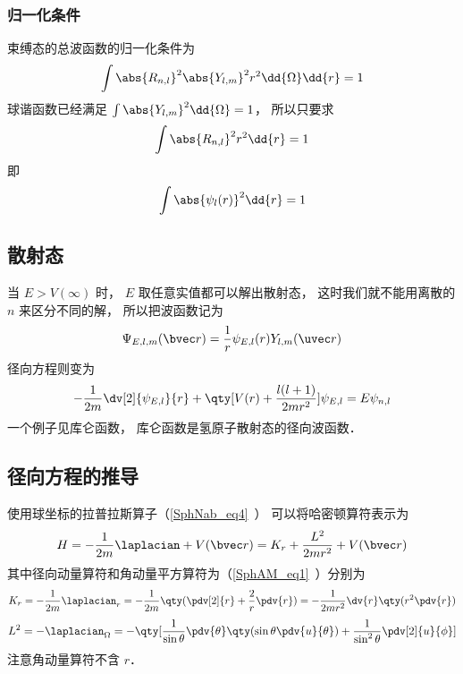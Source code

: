 \subsubsection{归一化条件}
束缚态的总波函数的归一化条件为
\begin{equation}
\int \abs{R_{n,l}}^2 \abs{Y_{l,m}}^2 r^2 \dd{\Omega}\dd{r}  = 1
\end{equation}
球谐函数已经满足 $\int \abs{Y_{l,m}}^2 \dd{\Omega} = 1$，  所以只要求
\begin{equation}
\int \abs{R_{n,l}}^2 r^2 \dd{r}  = 1
\end{equation}
即
\begin{equation}
\int \abs{\psi_l(r)}^2 \dd{r}  = 1
\end{equation}

\subsection{散射态}
当 $E > V(\infty)$ 时， $E$ 取任意实值都可以解出散射态， 这时我们就不能用离散的 $n$ 来区分不同的解， 所以把波函数记为
\begin{equation}
\Psi_{E, l,m}(\bvec r) = \frac{1}{r}\psi_{E, l}(r) Y_{l,m}(\uvec r)
\end{equation}
径向方程则变为
\begin{equation}
-\frac{1}{2m} \dv[2]{\psi_{E, l}}{r} + \qty[V(r) + \frac{l(l + 1)}{2mr^2}]\psi_{E, l} = E \psi_{n, l}
\end{equation}
一个例子见库仑函数， 库仑函数是氢原子散射态的径向波函数．

\subsection{径向方程的推导}
使用球坐标的拉普拉斯算子（\autoref{SphNab_eq4}~） 可以将哈密顿算符表示为
\begin{equation}
H = -\frac{1}{2m} \laplacian + V(\bvec r) =  K_r + \frac{L^2}{2mr^2} + V(\bvec r)
\end{equation}
其中径向动量算符和角动量平方算符为（\autoref{SphAM_eq1}~）分别为
\begin{equation}
K_r =-\frac{1}{2m} \laplacian_r =  - \frac{1}{2m} \qty(\pdv[2]{r} + \frac2r \pdv{r}) = -\frac{1}{2mr^2} \dv{r} \qty(r^2\pdv{r})
\end{equation}
\begin{equation}\label{RadSE_eq3}
L^2 = -\laplacian_\Omega = -\qty[ \frac{1}{\sin\theta} \pdv{\theta} \qty(\sin \theta \pdv{u}{\theta}) + \frac{1}{\sin^2 \theta} \pdv[2]{u}{\phi}]
\end{equation}
注意角动量算符不含 $r$．

